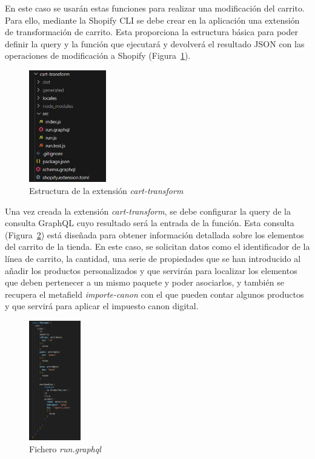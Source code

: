 \documentclass[12pt]{article}
\begin{document}
En este caso se usarán estas funciones para realizar una modificación del carrito. Para ello, mediante la Shopify CLI se debe crear en la aplicación una extensión de transformación de carrito. Esta proporciona 
la estructura básica para poder definir la query y la función que ejecutará y devolverá el resultado JSON con las operaciones de modificación a Shopify (Figura~\ref{fig:estructuracarttrans}). 

\begin{figure}[ht]
    \centering
    \includegraphics[width=0.3\textwidth]{imagenes-tema/estructuraCartTransform.png}
    \caption{\label{fig:estructuracarttrans} Estructura de la extensión \textit{cart-transform}}
    \vspace{\fill}
\end{figure}

Una vez creada la extensión \textit{cart-transform}, se debe configurar la query de la consulta GraphQL cuyo resultado será la entrada de la función. Esta consulta (Figura~\ref{fig:queryCart}) está diseñada para obtener
información detallada sobre los elementos del carrito de la tienda. En este caso, se solicitan datos como el identificador de la línea de carrito, la cantidad, una serie de propiedades que se han introducido al añadir los productos personalizados 
y que servirán para localizar los elementos que deben pertenecer a un mismo paquete y poder asociarlos, y también se recupera el 
metafield \textit{importe-canon} con el que pueden contar algunos productos y que servirá para aplicar el impuesto canon digital.


\begin{figure}[ht]
    \centering
    \includegraphics[width=0.2\textwidth]{imagenes-tema/queryCartTransform.png}
    \caption{\label{fig:queryCart} Fichero \textit{run.graphql}}
    \vspace{\fill}
\end{figure}
\end{document}
